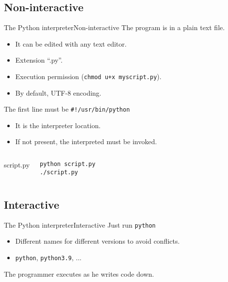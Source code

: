 \documentclass[10pt,compress]{beamer} %
\begin{document}
\subsection{Non-interactive}
\begin{frame}[fragile]{The Python interpreter}{Non-interactive}
	The program is in a plain text file.
		\begin{itemize}
		\item It can be edited with any text editor.
		\item Extension ``.py''.
		\item Execution permission (\texttt{chmod u+x myscript.py}).
		\item By default, UTF-8 encoding.
		\end{itemize}
	The first line must be \texttt{\#!/usr/bin/python}
		\begin{itemize}
		\item It is the interpreter location.
		\item If not present, the interpreted must be invoked.
		\end{itemize}

    \begin{columns}
	
		\vspace{-0.2cm}
		\begin{block}{script.py}
		\vspace{-0.2cm}
			
		\end{block}

    	\begin{block}{}
\begin{verbatim}
python script.py
./script.py
\end{verbatim}
		\end{block}
	\end{columns}
\end{frame}

\subsection{Interactive}
\begin{frame}{The Python interpreter}{Interactive}
		Just run \texttt{python}
			\begin{itemize}
				\item Different names for different versions to avoid conflicts.
				\item \texttt{python}, \texttt{python3.9}, ...
			\end{itemize}

		\vspace{-0.2cm}
		\begin{block}{}
		\vspace{-0.2cm}
			
		\end{block}
		The programmer executes as he writes code down.
\end{frame}
\end{document}
